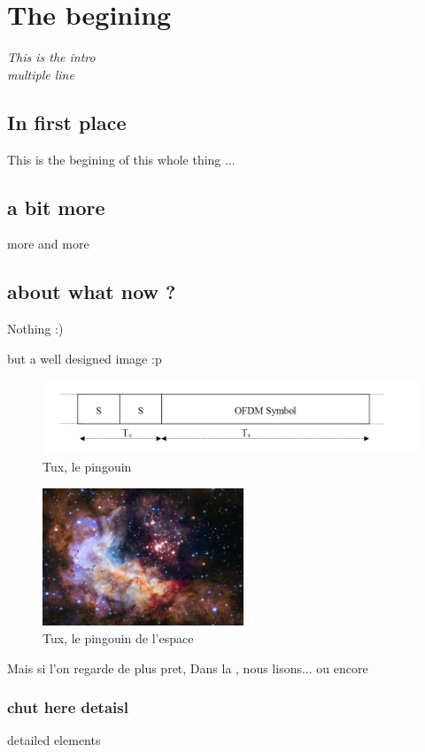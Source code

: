 \chapter{The begining}

\textit{%
This is the intro\\
multiple line
}

\section{In first place}

This is the begining of this whole thing ...

\section{a bit more}

more and more

\section{about what now ? }

Nothing :) 

but a well designed image :p 

\begin{figure}[h]
\centering
\includegraphics{src/content/img/structure_trame_tx.png}
\caption{Tux, le pingouin}
\end{figure}


\begin{figure}[h]
\centering
\includegraphics[width=6cm]{src/content/img/space.jpg}
\caption{Tux, le pingouin de l'espace}
\end{figure}

Mais si l'on regarde de plus pret, Dans la , nous lisons... ou encore 
\subsection{chut here detaisl}

detailed elements
